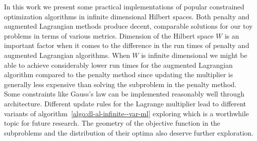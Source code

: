In this work we present some practical implementations of popular constrained optimization algorithms in infinite dimensional Hilbert spaces. Both penalty and augmented Lagrangian methods produce decent, comparable solutions for our toy problems in terms of various metrics. Dimension of the Hilbert space $W$ is an important factor when it comes to the difference in the run times of penalty and augmented Lagrangian algorithms. When $W$ is infinite dimensional we might be able to achieve considerably lower run times for the augmented Lagrangian algorithm compared to the penalty method since updating the multiplier is generally less expensive than solving the subproblem in the penalty method. Some constraints like Gauss's law can be implemented reasonably well through architecture. Different update rules for the Lagrange multiplier lead to different variants of algorithm~\ref{algo:dl-al-infinite--var-ml} exploring which is a worthwhile topic for future research. The geometry of the objective function in the subproblems and the distribution of their optima also deserve further exploration.     